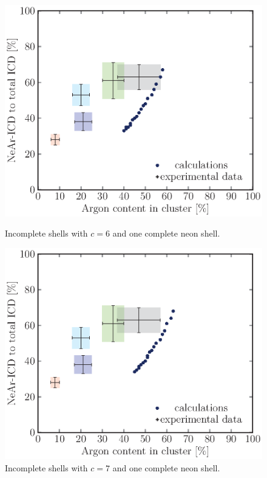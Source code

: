 \begin{figure}[!h]
\begin{minipage}{0.48\textwidth}
    \centering
    \includegraphics[scale=0.5]{pics/incompl01_06.ps}
    \caption{Incomplete shells with $c=6$ and one complete neon shell.}
    \label{incompl01_06}
\end{minipage}
\hfill
\begin{minipage}{0.48\textwidth}
    \centering
    \includegraphics[scale=0.5]{pics/incompl01_07.ps}
    \caption{Incomplete shells with $c=7$ and one complete neon shell.}
    \label{incompl01_07}
\end{minipage}
\end{figure}

